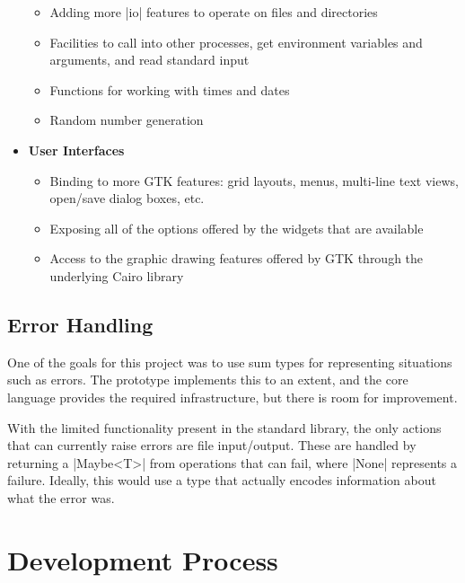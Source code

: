 \documentclass[11pt]{report}
\begin{document}
\begin{itemize}
\begin{itemize}[nosep,topsep=0pt]
        \item Adding more |io| features to operate on files and directories
        
        \item Facilities to call into other processes, get environment variables and arguments, and read standard input

        \item Functions for working with times and dates
        
        \item Random number generation
    \end{itemize}
    
    \item \textbf{User Interfaces}

    \begin{itemize}[nosep,topsep=0pt]
        \item Binding to more GTK features: grid layouts, menus, multi-line text views, open/save dialog boxes, etc.
        
        \item Exposing all of the options offered by the widgets that are available
        
        \item Access to the graphic drawing features offered by GTK through the underlying Cairo library
    \end{itemize}
\end{itemize}

\subsection{Error Handling}

One of the goals for this project was to use sum types for representing situations such as errors. The prototype implements this to an extent, and the core language provides the required infrastructure, but there is room for improvement.

With the limited functionality present in the standard library, the only actions that can currently raise errors are file input/output. These are handled by returning a |Maybe<T>| from operations that can fail, where |None| represents a failure. Ideally, this would use a type that actually encodes information about what the error was.

\section{Development Process}
\end{document}
